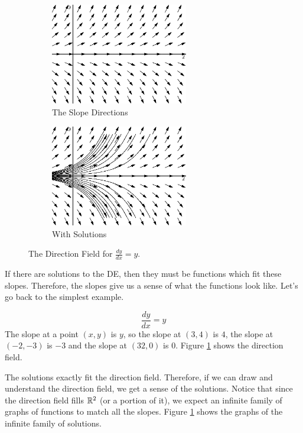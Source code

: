 \documentclass[fleqn,letterpaper]{report}
\begin{document}
\begin{figure}[h!]
\centering
\begin{subfigure}{.5\textwidth}
\centering
\includegraphics[width=6cm]{figure06.eps}
\caption{The Slope Directions}
\end{subfigure}%
\begin{subfigure}{.5\textwidth}
\centering
\includegraphics[width=6cm]{figure07.eps}
\caption{With Solutions}
\end{subfigure}
\caption{The Direction Field for $\frac{dy}{dx} = y$.}
\label{figure-direction-field1}
\end{figure}

If there are solutions to the DE, then they must be functions
which fit these slopes. Therefore, the slopes give us a sense
of what the functions look like. Let's go back to the
simplest example.

\begin{example}
\begin{equation*}
\frac{dy}{dx} = y
\end{equation*}
The slope at a point $(x,y)$ is $y$, so the slope at $(3,4)$
is $4$, the slope at $(-2,-3)$ is $-3$ and the slope at
$(32,0)$ is $0$. Figure \ref{figure-direction-field1} shows the
direction field.

The solutions exactly fit the direction field.
Therefore, if we can draw and understand the direction field,
we get a sense of the solutions. Notice that since the
direction field fills $\mathbb{R}^2$ (or a portion of it), we expect
an infinite family of graphs of functions to match all the
slopes. Figure \ref{figure-direction-field1} shows the
graphs of the infinite family of solutions.
\end{example}
\end{document}
